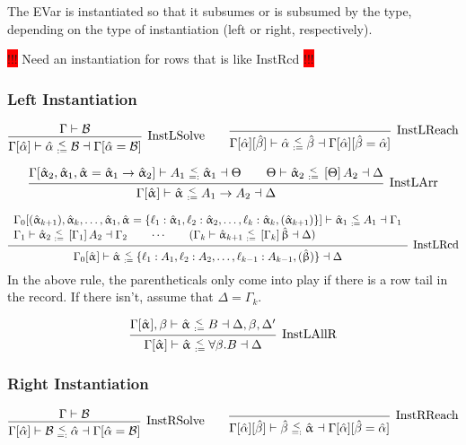 \documentclass{article}
\newcommand{\consider}[1]{\colorbox{red}{!!!} #1 \colorbox{red}{!!!}}
\newcommand{\spc}{\qquad}
\newcommand{\lbl}{\ell}
\newcommand{\ev}{\hat}
\newcommand{\evar}[1][]{\ev \upalpha_{#1}}
\newcommand{\evaralt}{\ev \upbeta}
\newcommand{\B}{\mathcal{B}}
\newcommand{\instLSymbol}{\;\substack{<\\:=}\;}
\newcommand{\instRSymbol}{\;\substack{<\\=:}\;}
\newcommand{\apply}[1]{\left[#1\right]}
\newcommand{\instL}[4]{#1 \vdash #2 \instLSymbol #3 \dashv #4}
\newcommand{\instR}[4]{#1 \vdash #2 \instRSymbol #3 \dashv #4}
\newcommand{\deduct}[3][]
{
  \begin{prooftree}
    \hypo{#2}
    \infer1[\text{#1}]{#3}
  \end{prooftree}
}
\begin{document}
The EVar is instantiated so that it subsumes or is subsumed by the type,
depending on the type of instantiation (left or right, respectively).

\consider{Need an instantiation for rows that is like InstRcd}

\subsubsection{Left Instantiation}

\[
  \deduct[InstLSolve]
  {\Gamma \vdash \B}
  {\instL{\Gamma[\ev\alpha]}{\ev \alpha}{\B}{\Gamma[\ev\alpha = \B]}}
  \spc
  \deduct[InstLReach]
  {}
  {\instL{\Gamma[\ev\alpha][\ev\beta]}{\ev \alpha}{\ev
      \beta}{\Gamma[\ev\alpha][\ev\beta = \ev\alpha]}}
\]

\[
  \deduct[InstLArr] {\instR{\Gamma[\evar[2], \evar[1], \evar = \evar[1] \to
      \evar[2]]}{A_1}{\evar[1]}{\Theta} \spc \instL{\Theta}{\evar[2]}{\apply \Theta
      A_2}{\Delta} } {\instL{\Gamma[\evar]}{\evar}{A_1 \to A_2}{\Delta}}
\]

\[
  \deduct[InstLRcd]
  {
    \begin{array}{l}
     \instL{\Gamma_0[(\evar[k+1]), \evar[k], \dots, \evar[1], \evar=\{\lbl_1 : \evar[1],
      \lbl_2 : \evar[2], \dots, \lbl_k : \evar[k], (\evar[k+1])\}]}{\evar[1]}{A_1}{\Gamma_1} \\
    \instL{\Gamma_1}{\evar[2]}{\apply{\Gamma_1} A_2}{\Gamma_2} \spc \cdots \spc
     (\instL{\Gamma_k}{\evar[k+1]}{\apply{\Gamma_k}\evaralt}{\Delta})
  \end{array}
  }
  {\instL{\Gamma_0[\evar]}{\evar}{\{\lbl_1:A_1, \lbl_2 : A_2, \dots, \lbl_{k-1} : A_{k-1}, (\evaralt)\}}{\Delta}}
\]
In the above rule, the parentheticals only come into play if there is a row tail
in the record. If there isn't, assume that \(\Delta = \Gamma_k\).

\[
  \deduct[InstLAllR]
  { \instL{\Gamma[\evar], \beta}{\evar}{B}{\Delta, \beta, \Delta'} }
  { \instL{\Gamma[\evar]}{\evar}{\forall \beta. B}{\Delta} }
\]

\subsubsection{Right Instantiation}

\[
  \deduct[InstRSolve]
  {\Gamma \vdash \B}
  {\instR{\Gamma[\ev\alpha]}{\B}{\ev \alpha}{\Gamma[\ev\alpha = \B]}}
  \spc
  \deduct[InstRReach]
  {}
  {\instR{\Gamma[\ev\alpha][\ev\beta]}{\ev
      \beta}{\evar}{\Gamma[\ev\alpha][\ev\beta = \ev\alpha]}}
\]
\end{document}
